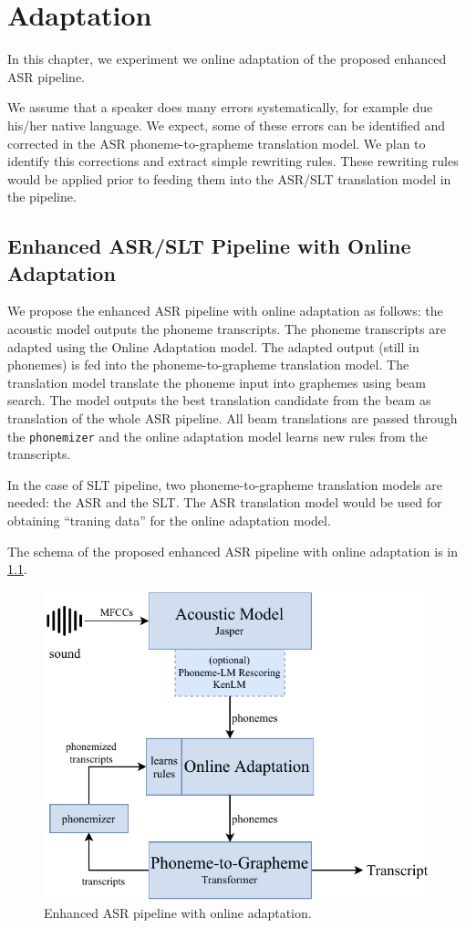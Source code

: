 \chapter{Adaptation}
\label{chap:adaptation}
In this chapter, we experiment we online adaptation of the proposed enhanced ASR pipeline.

We assume that a speaker does many errors systematically, for example due his/her native language. We expect, some of these errors can be identified and corrected in the ASR phoneme-to-grapheme translation model. We plan to identify this corrections and extract simple rewriting rules. These rewriting rules would be applied prior to feeding them into the ASR/SLT translation model in the pipeline.


\section{Enhanced ASR/SLT Pipeline with Online Adaptation}
We propose the enhanced ASR pipeline with online adaptation as follows: the acoustic model outputs the phoneme transcripts. The phoneme transcripts are adapted using the Online Adaptation model. The adapted output (still in phonemes) is fed into the phoneme-to-grapheme translation model. The translation model translate the phoneme input into graphemes using beam search. The model outputs the best translation candidate from the beam as translation of the whole ASR pipeline. All beam translations are passed through the \texttt{phonemizer} and the online adaptation model learns new rules from the transcripts.

In the case of SLT pipeline, two phoneme-to-grapheme translation models are needed: the ASR and the SLT. The ASR translation model would be used for obtaining ``traning data'' for the online adaptation model.

The schema of the proposed enhanced ASR pipeline with online adaptation is in \cref{fig:online_easr}.

\begin{figure}[t]
	\centering
	\includegraphics[width=.9\textwidth]{img/online_easr}
	\caption{Enhanced ASR pipeline with online adaptation.}
	\label{fig:online_easr}
\end{figure} 